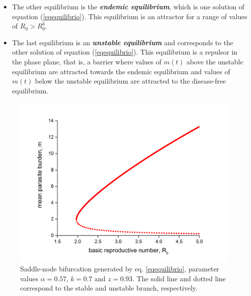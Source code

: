 \documentclass[eng]{MMSB-class-eng}
\begin{document}
{{\begin{itemize}
	\item The other equilibrium
	is the \textit{\textbf{endemic equilibrium}}, which is one solution of equation (\ref{eqequilibrio}).
	This equilibrium is an attractor for a range of values of $R_0> R_0^b $.
	
	\item The last equilibrium is an \textit{\textbf{unstable equilibrium}} and corresponds to the other solution of equation (\ref{eqequilibrio}).
	This equilibrium is a repulsor in the phase plane, that is, a barrier where values of $m(t)$ above the unstable equilibrium are attracted towards the endemic equilibrium and values of $m(t)$ below the unstable equilibrium are attracted to the disease-free equilibrium.
\end{itemize}


\begin{figure}[h!]
	\centering
	\includegraphics[width=0.99\linewidth]{bifurcation}
	\caption{Saddle-node bifurcation generated by eq. \eqref{eqequilibrio}, parameter values $\alpha=0.57$, $k=0.7$ and $z=0.93$.
	The solid line and dotted line correspond to the stable and unstable branch, respectively.}
	\label{f:phase}
\end{figure}

}



}
\end{document}

